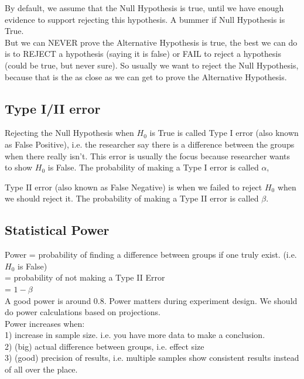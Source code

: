 By default, we assume that the Null Hypothesis is true, until we have enough evidence to support rejecting this hypothesis. A bummer if Null Hypothesis is True. \\

But we can NEVER prove the Alternative Hypothesis is true, the best we can do is to REJECT a hypothesis (saying it is false) or FAIL to reject a hypothesis (could be true, but never sure). So usually we want to reject the Null Hypothesis, because that is the as close as we can get to prove the Alternative Hypothesis.

\subsection{Type I/II error}

Rejecting the Null Hypothesis when $H_0$ is True is called Type I error (also known as False Positive), i.e. the researcher say there is a difference between the groups when there really isn't. This error is usually the focus because researcher wants to show $H_0$ is False. The probability of making a Type I error is called $\alpha$, 

Type II error (also known as False Negative) is when we failed to reject $H_0$ when we should reject it. The probability of making a Type II error is called $\beta$. 

\subsection{Statistical Power}

Power = probability of finding a difference between groups if one truly exist. (i.e. $H_0$ is False)\\
= probability of not making a Type II Error \\
= $1 - \beta$\\

A good power is around 0.8. Power matters during experiment design. We should do power calculations based on projections.\\

Power increases when:\\
1) increase in sample size. i.e. you have more data to make a conclusion.\\
2) (big) actual difference between groups, i.e. effect size\\
3) (good) precision of results, i.e. multiple samples show consistent results instead of all over the place.\\

